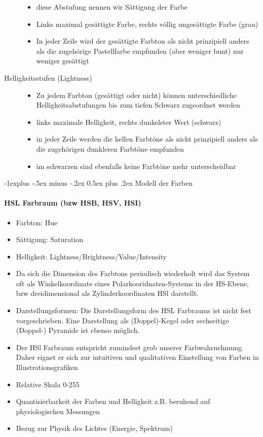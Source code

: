 \documentclass[10pt,landscape]{article}
\makeatletter
\renewcommand{\subsection}{\@startsection{subsection}{2}{0mm}%
                                {-1explus -.5ex minus -.2ex}%
                                {0.5ex plus .2ex}%
                                {\normalfont\normalsize\bfseries}}
\makeatother
\begin{document}
\begin{multicols}{3}
\begin{description}
\begin{itemize}
          \item diese Abstufung nennen wir Sättigung der Farbe
          \item Links maximal gesättigte Farbe, rechts völlig ungesättigte Farbe (grau)
          \item In jeder Zeile wird der gesättigte Farbton als nicht prinzipiell anders als die zugehörige Pastellfarbe empfunden (aber weniger bunt) nur weniger gesättigt
        \end{itemize}
  \item[Helligkeitsstufen (Lightness)]
        \begin{itemize}
          \item  Zu jedem Farbton (gesättigt oder nicht) können unterschiedliche Helligkeitsabstufungen bis zum tiefen Schwarz zugeordnet werden
          \item links maximale Helligkeit, rechts dunkelster Wert (schwarz)
          \item in jeder Zeile werden die hellen Farbtöne als nicht prinzipiell anders als die zugehörigen dunkleren Farbtöne empfunden
          \item im schwarzen sind ebenfalls keine Farbtöne mehr unterscheidbar
        \end{itemize}
\end{description}

\subsection{Modell der Farben}
\paragraph{HSL Farbraum (bzw HSB, HSV, HSI)}
\begin{itemize}
  \item Farbton: Hue
  \item Sättigung: Saturation
  \item Helligkeit: Lightness/Brightness/Value/Intensity
  \item Da sich die Dimension des Farbtons periodisch wiederholt wird das System oft als Winkelkoordinate eines Polarkooridnaten-Systems in der HS-Ebene, bzw dreidimensional als Zylinderkoordinaten HSl darstellt.
  \item Darstellungsformen: Die Darstellungsform des HSL Farbraums ist nicht fest vorgeschrieben. Eine Darstellung als (Doppel)-Kegel oder sechseitige (Doppel-) Pyramide ist ebenso möglich.
  \item Der HSl Farbraum entspricht zumindest grob unserer Farbwahrnehmung. Daher eignet er sich zur intuitiven und qualitativen Einstellung von Farben in Illustrationsgrafiken
  \item Relative Skala 0-255
  \item Quantisierbarkeit der Farben und Helligkeit z.B. beruhend auf physiologischen Messungen
  \item Bezug zur Physik des Lichtes (Energie, Spektrum)
\end{itemize}

\end{multicols}
\end{document}
